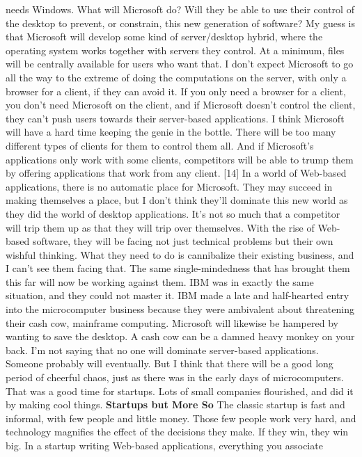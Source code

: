 needs Windows.  What will Microsoft do?  Will they be able to use
their control of the desktop to prevent, or constrain, this new
generation of software?
My guess is that Microsoft will develop some kind of server/desktop
hybrid, where the operating system works together with servers they
control.  At a minimum, files will be centrally available for users
who want that.  I don't expect Microsoft to go all the way to the
extreme of doing the computations on the server, with only a browser
for a client, if they can avoid it. If you only need a browser for
a client, you don't need Microsoft on the client, and if Microsoft
doesn't control the client, they can't push users towards their
server-based applications.
I think Microsoft will have a hard time keeping the genie in the
bottle.  There will be too many different types of clients for them
to control them all.  And if Microsoft's applications only work
with some clients, competitors will be able to trump them by offering
applications that work from any client. [14]
In a world of Web-based applications, there is no automatic place
for Microsoft.  They may succeed in making themselves a place, but
I don't think they'll dominate this new world as they did the world
of desktop applications.
It's not so much that a competitor will trip them up as that they
will trip over themselves.  With the rise of Web-based software,
they will be facing not just technical problems but their own
wishful thinking.  What they need to do is cannibalize their existing
business, and I can't see them facing that.  The same single-mindedness
that has brought them this far will now be working against them.
IBM was in exactly the same situation, and they could not master
it.  IBM made a late and half-hearted entry into the microcomputer
business because they were ambivalent about threatening their cash
cow, mainframe computing.  Microsoft will likewise be hampered by
wanting to save the desktop.  A cash cow can be a damned heavy
monkey on your back.
I'm not saying that no one will dominate server-based applications.
Someone probably will eventually.  But I think that there will be
a good long period of cheerful chaos, just as there was in the
early days of microcomputers.  That was a good time for startups.
Lots of small companies flourished, and did it by making cool
things.
\textbf{Startups but More So}
The classic startup is fast and informal, with few people and little
money.  Those few people work very hard, and technology magnifies
the effect of the decisions they make.  If they win, they win big.
In a startup writing Web-based applications, everything you associate

